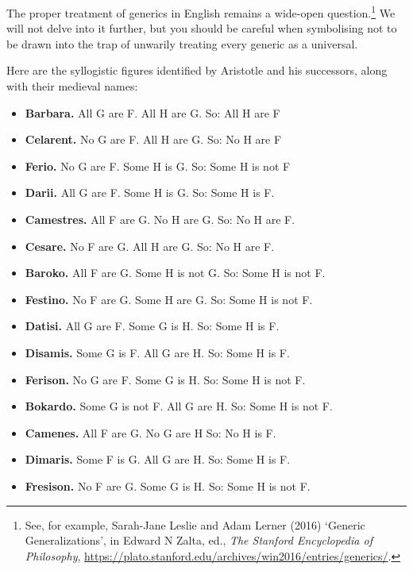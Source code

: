 The proper treatment of generics in English remains a wide-open question.\footnote{See, for example, Sarah-Jane Leslie and Adam Lerner (2016) `Generic Generalizations', in Edward N Zalta, ed., \emph{The Stanford Encyclopedia of Philosophy}, \url{https://plato.stanford.edu/archives/win2016/entries/generics/}.} We will not delve into it further, but you should be careful when symbolising not to be drawn into the trap of unwarily treating every generic as a universal.




\practiceproblems
\problempart
\label{pr.BarbaraEtc}
Here are the syllogistic figures identified by Aristotle and his successors, along with their medieval names:
\begin{itemize}
	\item \textbf{Barbara.} All G are F. All H are G. So:  All H are F
	\item \textbf{Celarent.} No G are F. All H are G. So: No H are F
	\item \textbf{Ferio.} No G are F. Some H is G. So: Some H is not F
	\item \textbf{Darii.} All G are F. Some H is G. So: Some H is F.
	\item \textbf{Camestres.} All F are G. No H are G. So: No H are F.
	\item \textbf{Cesare.} No F are G. All H are G. So: No H are F.
	\item \textbf{Baroko.} All F are G. Some H is not G. So: Some H is not F.
	\item \textbf{Festino.} No F are G. Some H are G. So: Some H is not F.
	\item \textbf{Datisi.} All G are F. Some G is H. So: Some H is F.
	\item \textbf{Disamis.} Some G is F. All G are H. So: Some H is F.
	\item \textbf{Ferison.} No G are F. Some G is H. So: Some H is not F.
	\item \textbf{Bokardo.} Some G is not F. All G are H. So:  Some H is not F.
	\item \textbf{Camenes.} All F are G. No G are H So: No H is F.
	\item \textbf{Dimaris.} Some F is G. All G are H. So: Some H is F.
	\item \textbf{Fresison.} No F are G. Some G is H. So: Some H is not F.
\end{itemize}
